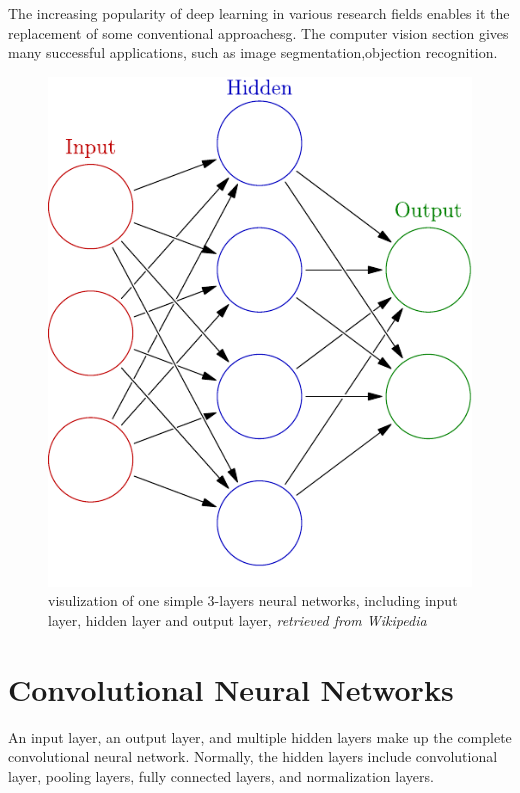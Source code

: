     The increasing popularity of deep learning in various research fields enables it the replacement of some conventional approachesg. The computer vision section gives many successful applications, such as image segmentation\cite{lecun2015deep},objection recognition\cite{he2016deep}.
     \begin{figure}[!ht]
        \centering
        \includegraphics[scale = 0.5]{Figures/Colored_neural_network}
        \caption{visulization of one simple $3$-layers neural networks, including input layer, hidden layer and output layer, \textit{retrieved from Wikipedia}}
    \end{figure}

\section{Convolutional Neural Networks}
    \label{cnn}
    An input layer, an output layer, and multiple hidden layers make up the complete convolutional neural network. Normally, the hidden layers include convolutional layer, pooling layers, fully connected layers, and normalization layers. \\

